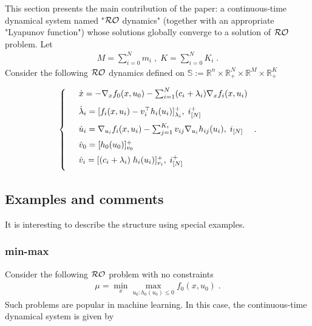 \documentclass[journal,twoside,web]{ieeecolor}
\begin{document}
This section presents the main contribution of the paper: a continuous-time dynamical system named "${\cal RO}$ dynamics" (together with an appropriate "Lyapunov function") whose solutions globally converge to a solution of ${\cal RO}$ problem. Let
\begin{align*}
M=\sum_{i=0}^{N}m_i\;,\; K=\sum_{i=0}^{N}K_i\;.
\end{align*}
Consider the following ${\cal RO}$ dynamics defined on $\mathbb{S}:= \mathbb{R}^n \times \mathbb{R}^N_{+} \times \mathbb{R}^M \times \mathbb{R}^K_+$\;

\begin{align} \label{pd_dynamics}
\left\{
\begin{array}{cl}
\vspace{3mm}
&\dot x=-\nabla_x f_0(x,u_0)-  \sum_{i=1}^N(c_i+\lambda_i) \nabla_x f_i(x,u_i)\\
\vspace{2mm}
&\dot \lambda_i=[f_i(x,u_i)-v_i^\top h_i(u_i)]_{\lambda_i}^+,\; i^+_{[N]}\\
\vspace{2mm}
&\dot u_i=\nabla_{u_i}f_i(x,u_i)-  \sum_{j=1}^{K_i} v_{ij} \nabla_{u_i} h_{ij}(u_i),\; i_{[N]}\\
\vspace{2mm}
&\dot{v}_0=[h_0(u_0)]_{v_0}^+\\
\vspace{2mm}
&\dot v_i=[(c_i+\lambda_i) \; h_i(u_i)]_{v_i}^+,\;i^+_{[N]}
\end{array}\right..
\end{align}

\subsection{Examples and comments} \label{examples_and_comments}
It is interesting to describe the structure using special examples.

\subsubsection{min-max} Consider the following ${\cal RO}$ problem with no constraints
\begin{align*}
\mu=\min_x\max_{u_0:h_0(u_0)\leq 0}f_0(x,u_0)\;.
\end{align*}
Such problems are popular in machine learning. In this case, the continuous-time dynamical system is given by
\end{document}
